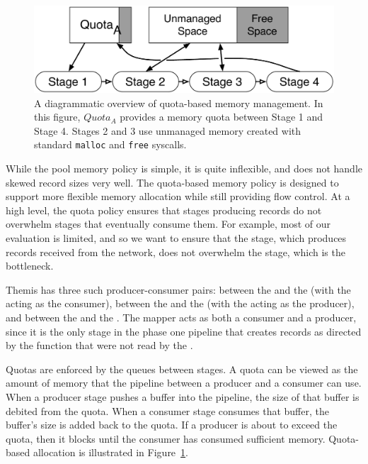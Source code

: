 \begin{figure}
  \centering
  \includegraphics[width=\columnwidth]{themis/figures/quota_based_manager.pdf}
  \caption{\label{fig:memory_allocators:quota} A diagrammatic overview of
    quota-based memory management. In this figure, $Quota_A$ provides a memory
    quota between Stage 1 and Stage 4. Stages 2 and 3 use unmanaged memory
    created with standard \texttt{malloc} and \texttt{free} syscalls.}
\end{figure}

While the pool memory policy is simple, it is quite inflexible, and does not
handle skewed record sizes very well.  The quota-based memory policy is
designed to support more flexible memory allocation while still providing flow
control.  At a high level, the quota policy ensures that stages producing
records do not overwhelm stages that eventually consume them.  For example,
most of our evaluation is \writer limited, and so we want to ensure that the
\receiver stage, which produces records received from the network, does not
overwhelm the \writer stage, which is the bottleneck.

Themis has three such producer-consumer pairs: between the \reader and the
\mapper (with the \mapper acting as the consumer), between the \mapper and the
\sender (with the \mapper acting as the producer), and between the \receiver
and the \writer. The mapper acts as both a consumer and a producer, since it is
the only stage in the phase one pipeline that creates records as directed by
the \map function that were not read by the \reader.

Quotas are enforced by the queues between stages. A quota can be viewed as the
amount of memory that the pipeline between a producer and a consumer can use.
When a producer stage pushes a buffer into the pipeline, the size of that
buffer is debited from the quota.  When a consumer stage consumes that buffer,
the buffer's size is added back to the quota.  If a producer is about to exceed
the quota, then it blocks until the consumer has consumed sufficient
memory. Quota-based allocation is illustrated in
Figure~\ref{fig:memory_allocators:quota}.

